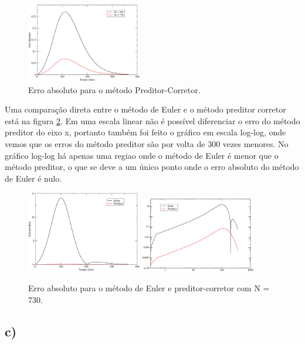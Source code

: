 \documentclass[a4wide]{report}
\begin{document}
\begin{figure}[!htb]
\centering
\includegraphics[width=0.447\textwidth]{erroPreditor.pdf}
\caption{Erro absoluto para o método Preditor-Corretor. }
\label{erropreditor}
\end{figure}

Uma comparação direta entre o método de Euler e o método preditor corretor está na figura \ref{erropreditorrk}. Em uma escala linear não é possível diferenciar o erro do método preditor do eixo x, portanto também foi feito o gráfico em escala log-log, onde vemos que os erros do método preditor são por volta de 300 vezes menores. No gráfico log-log há apenas uma regiao onde o método de Euler é menor que o método preditor, o que se deve a um único ponto onde o erro absoluto do método de Euler é nulo. 

\begin{figure}[!htb]
\centering
\includegraphics[width=0.447\textwidth]{1erro_preditor.pdf}
\includegraphics[width=0.447\textwidth]{1erro_euler_preditor_log.pdf}
\caption{Erro absoluto para o método de Euler e preditor-corretor com N = 730. }
\label{erropreditorrk}
\end{figure}


\subsection*{ c) }
\end{document}
